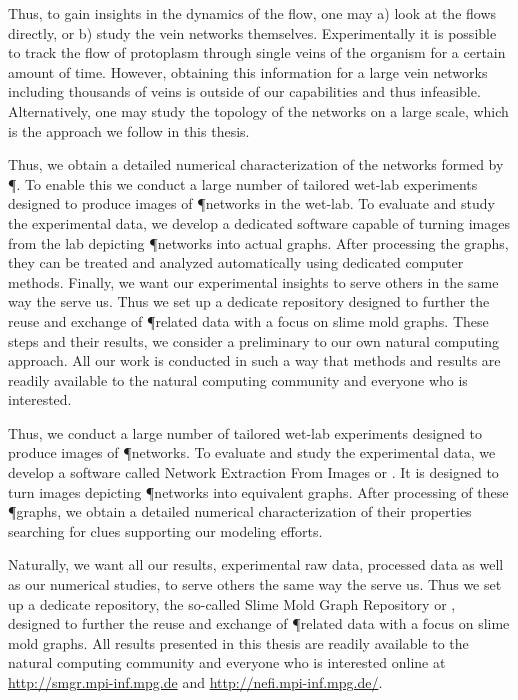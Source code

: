	Thus, to gain insights in the dynamics of the flow, one may a) look at the flows directly, or b) study the vein networks themselves. Experimentally it is possible to track the flow of protoplasm through single veins of the organism for a certain amount of time. However, obtaining this information for a large vein networks including thousands of veins is outside of our capabilities and thus infeasible. Alternatively, one may study the topology of the networks on a large scale, which is the approach we follow in this thesis. 

	Thus, we obtain a detailed numerical characterization of the networks formed by \P. To enable this we conduct a large number of tailored wet-lab experiments designed to produce images of \P networks in the wet-lab. To evaluate and study the experimental data, we develop a dedicated software capable of turning images from the lab depicting \P networks into actual graphs. After processing the graphs, they can be treated and analyzed automatically using dedicated computer methods. Finally, we want our experimental insights to serve others in the same way the serve us. Thus we set up a dedicate repository designed to further the reuse and exchange of \P related data with a focus on slime mold graphs. These steps and their results, we consider a preliminary to our own natural computing approach. All our work is conducted in such a way that methods and results are readily available to the  natural computing community and everyone who is interested. 


	Thus, we conduct a large number of tailored wet-lab experiments designed to produce images of \P networks. To evaluate and study the experimental data, we develop a software called Network Extraction From Images or \NEFI. It is designed to turn images depicting \P networks into equivalent graphs. After processing of these \P graphs, we obtain a detailed numerical characterization of their properties searching for clues supporting our modeling efforts. 

	Naturally, we want all our results, \ie experimental raw data, processed data as well as our numerical studies, to serve others the same way the serve us. Thus we set up a dedicate repository, the so-called Slime Mold Graph Repository or \SMGR, designed to further the reuse and exchange of \P related data with a focus on slime mold graphs. All results presented in this thesis are readily available to the natural computing community and everyone who is interested online at \href{http://smgr.mpi-inf.mpg.de}{http://smgr.mpi-inf.mpg.de} and \href{http://nefi.mpi-inf.mpg.de/}{http://nefi.mpi-inf.mpg.de/}.

